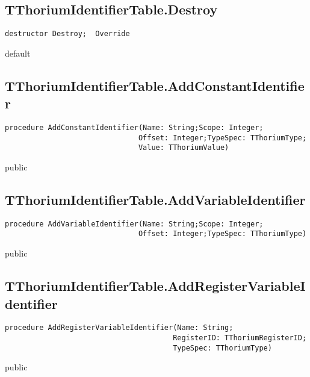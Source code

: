\subsection{TThoriumIdentifierTable.Destroy}
\label{thoriumcorepkg:thorium:tthoriumidentifiertable:destroy}
\begin{FPCList}
\Declaration 

\begin{verbatim}
destructor Destroy;  Override
\end{verbatim}
\Visibility
default
\end{FPCList}
\subsection{TThoriumIdentifierTable.AddConstantIdentifier}
\label{thoriumcorepkg:thorium:tthoriumidentifiertable:addconstantidentifier}
\begin{FPCList}
\Declaration 

\begin{verbatim}
procedure AddConstantIdentifier(Name: String;Scope: Integer;
                               Offset: Integer;TypeSpec: TThoriumType;
                               Value: TThoriumValue)
\end{verbatim}
\Visibility
public
\end{FPCList}
\subsection{TThoriumIdentifierTable.AddVariableIdentifier}
\label{thoriumcorepkg:thorium:tthoriumidentifiertable:addvariableidentifier}
\begin{FPCList}
\Declaration 

\begin{verbatim}
procedure AddVariableIdentifier(Name: String;Scope: Integer;
                               Offset: Integer;TypeSpec: TThoriumType)
\end{verbatim}
\Visibility
public
\end{FPCList}
\subsection{TThoriumIdentifierTable.AddRegisterVariableIdentifier}
\label{thoriumcorepkg:thorium:tthoriumidentifiertable:addregistervariableidentifier}
\begin{FPCList}
\Declaration 

\begin{verbatim}
procedure AddRegisterVariableIdentifier(Name: String;
                                       RegisterID: TThoriumRegisterID;
                                       TypeSpec: TThoriumType)
\end{verbatim}
\Visibility
public
\end{FPCList}
